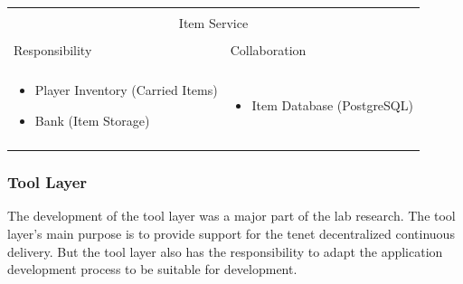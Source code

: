 \vspace{0.5cm} \noindent 
\begin{tabular}{|l|l|}
    \cline{1-2}
    \multicolumn{2}{|c|}{} \\[-0.3cm]
    \multicolumn{2}{|c|}{Item Service} \\ 
    \multicolumn{2}{|c|}{} \\[-0.3cm]
    \cline{1-2}
    Responsibility & Collaboration \\
    \cline{1-2}
    & \\[-0.2cm]
    \begin{minipage}{0.47\textwidth}
        \begin{itemize}
          \item Player Inventory (Carried Items)
          \item Bank (Item Storage)
        \end{itemize} 
    \end{minipage}
	&
    \begin{minipage}{0.47\textwidth}
        \begin{itemize}
          \item Item Database (PostgreSQL)
        \end{itemize} 
    \end{minipage}
	\\ & \\
    \hline
\end{tabular}

\subsubsection{Tool Layer}

The development of the tool layer was a major part of the lab research. The tool
layer's main purpose is to provide support for the tenet decentralized
continuous delivery. But the tool layer also has the responsibility to adapt the
\ms{} application development process to be suitable for \og{} development.\\

